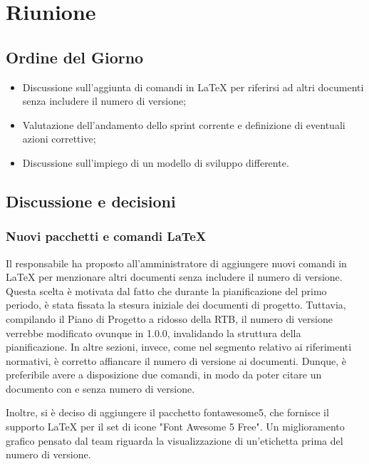 \section{Riunione}
\subsection{Ordine del Giorno}
\begin{itemize}
	\item Discussione sull'aggiunta di comandi in LaTeX per riferirsi ad altri documenti senza includere il numero di versione;
  \item Valutazione dell'andamento dello sprint corrente e definizione di eventuali azioni correttive;
  \item Discussione sull'impiego di un modello di sviluppo differente.
\end{itemize}

\subsection{Discussione e decisioni}

\subsubsection{Nuovi pacchetti e comandi LaTeX}
\par Il responsabile ha proposto all'amministratore di aggiungere nuovi comandi in LaTeX per menzionare altri documenti senza includere il numero di versione. Questa scelta è motivata dal fatto che durante la pianificazione del primo periodo, è stata fissata la stesura iniziale dei documenti di progetto. Tuttavia, compilando il Piano di Progetto a ridosso della RTB, il numero di versione verrebbe modificato ovunque in 1.0.0, invalidando la struttura della pianificazione. In altre sezioni, invece, come nel segmento relativo ai riferimenti normativi, è corretto affiancare il numero di versione ai documenti. Dunque, è preferibile avere a disposizione due comandi, in modo da poter citare un documento con e senza numero di versione.
\par Inoltre, si è deciso di aggiungere il pacchetto fontawesome5, che fornisce il supporto LaTeX per il set di icone "Font Awesome 5 Free". Un miglioramento grafico pensato dal team riguarda la visualizzazione di un'etichetta prima del numero di versione.

